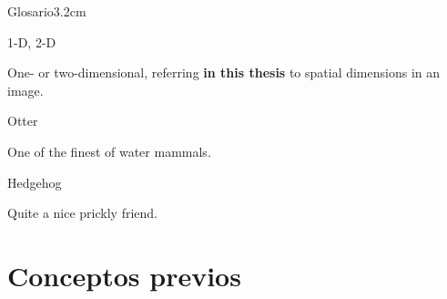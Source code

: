 \documentclass[a4paper, twoside]{templates/ociamthesis}
\theoremstyle{definition}
\theoremstyle{definition}
\theoremstyle{definition}
\theoremstyle{definition}
\theoremstyle{remark}
\begin{document}
\begin{romanpages}
  \dominitoc %

\flushbottom

\tableofcontents

\listoffigures
	\mtcaddchapter

\listoftables
  \mtcaddchapter
\begin{mclistof}{Glosario}{3.2cm}

\item[1-D, 2-D]

One- or two-dimensional, referring \textbf{in this thesis} to spatial dimensions in an image.

\item[Otter]

One of the finest of water mammals.

\item[Hedgehog]

Quite a nice prickly friend.

\end{mclistof} 


\end{romanpages}

\flushbottom

\hypertarget{conceptos-previos}{%
\chapter*{Conceptos previos}\label{conceptos-previos}}
\end{document}
